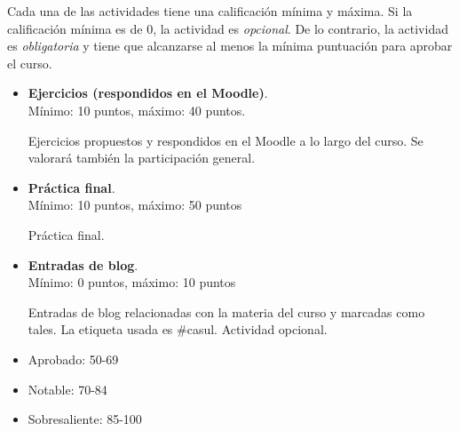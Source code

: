 \documentclass[a4paper]{article}
\begin{document}
Cada una de las actividades tiene una calificación mínima y máxima. Si la calificación mínima es de 0, la actividad es \textit{opcional}. De lo contrario, la actividad es 
\textit{obligatoria} y tiene que alcanzarse al menos la mínima puntuación para aprobar el curso.

\begin{itemize}
\item \textbf{Ejercicios (respondidos en el Moodle)}. \\
  Mínimo: 10 puntos, máximo: 40 puntos.

  Ejercicios propuestos y respondidos en el Moodle a lo largo del curso. Se valorará también la participación general.

\item \textbf{Práctica final}. \\
  Mínimo: 10 puntos, máximo: 50 puntos

  Práctica final. 

\item \textbf{Entradas de blog}. \\
  Mínimo: 0 puntos, máximo: 10 puntos

  Entradas de blog relacionadas con la materia del curso y marcadas como tales. La etiqueta usada es \#casul. Actividad opcional. 
\end{itemize} 

\begin{itemize}
\item Aprobado: 50-69
\item Notable: 70-84
\item Sobresaliente: 85-100
\end{itemize}

\end{document}
